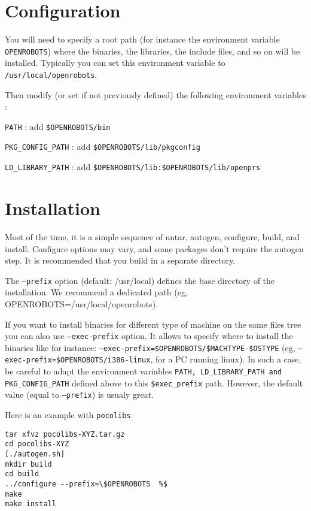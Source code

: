 \section{Configuration}
\label{sec|configuration|configuration}


You will need to specify a root path (for instance the environment
variable \texttt{OPENROBOTS}) where the binaries, the libraries, the
include files, and so on will be installed. Typically you can set this
environment variable to \texttt{/usr/local/openrobots}.

Then modify (or set if not previously defined) the following 
environment variables :

\texttt{PATH} :  add \texttt{\$OPENROBOTS/bin}

\texttt{PKG\_CONFIG\_PATH} :  add  \texttt{\$OPENROBOTS/lib/pkgconfig}

\texttt{LD\_LIBRARY\_PATH} :  add  \texttt{\$OPENROBOTS/lib:\$OPENROBOTS/lib/openprs}



\section{Installation}
\label{sec|configuration|installation}

Most of the time, it is a simple sequence of untar, autogen, configure,
build, and install. Configure options may vary, and some packages don't
require the autogen step. It is recommended that you build in a separate
directory. 

The \texttt{--prefix} option (default: /usr/local) defines the base directory
of the installation. We recommend a dedicated path (eg,
OPENROBOTS=/usr/local/openrobots).

If you want to install binaries for different type of machine
on the same files tree you can also use \texttt{--exec-prefix}
option. It allows to specify where to install the binaries like for
instance: \texttt{--exec-prefix=\$OPENROBOTS/\$MACHTYPE-\$OSTYPE} (eg,
\texttt{--exec-prefix=\$OPENROBOTS/i386-linux}, for a PC running linux).
In such a case, be careful to adapt the environment variables 
\texttt{PATH, LD\_LIBRARY\_PATH and PKG\_CONFIG\_PATH} defined above to this
\texttt{\$exec\_prefix} path.
However, the default value (equal to \texttt{--prefix}) is usualy great. 


Here is an
example with \texttt{pocolibs}. 

\begin{cartouche}
\begin{verbatim}
tar xfvz pocolibs-XYZ.tar.gz
cd pocolibs-XYZ
[./autogen.sh]
mkdir build
cd build
../configure --prefix=\$OPENROBOTS  %$
make
make install
\end{verbatim}
\end{cartouche}

